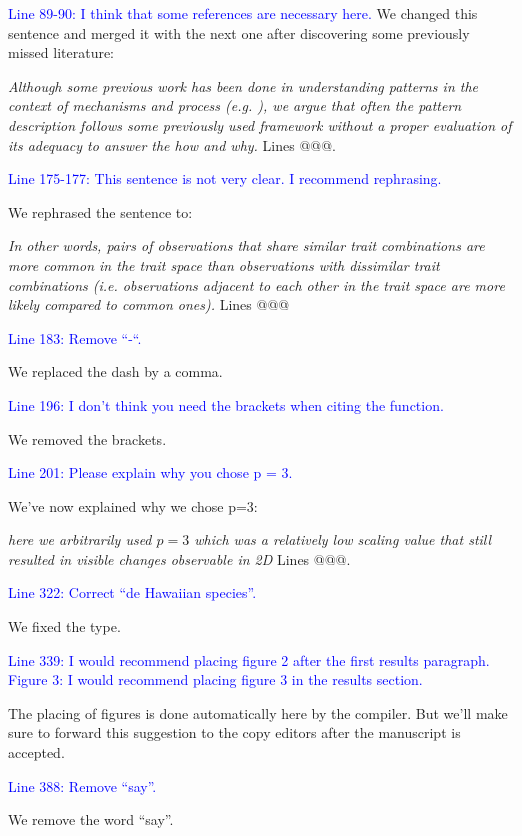 \documentclass[
]{article}
\begin{document}
\textcolor{blue}{Line 89-90: I think that some references are necessary here.}
We changed this sentence and merged it with the next one after discovering some previously missed literature:

\textit{Although some previous work has been done in understanding patterns in the context of mechanisms and process (e.g. \cite{novack2016general1,novack2016general2}), we argue that often the pattern description follows some previously used framework without a proper evaluation of its adequacy to answer the how and why.} Lines @@@.

\textcolor{blue}{Line 175-177: This sentence is not very clear. I recommend rephrasing.}

We rephrased the sentence to:

\textit{In other words, pairs of observations that share similar trait combinations are more common in the trait space than observations with dissimilar trait combinations (i.e. observations adjacent to each other in the trait space are more likely compared to common ones).} Lines @@@

\textcolor{blue}{Line 183: Remove “-“.}

We replaced the dash by a comma.

\textcolor{blue}{Line 196: I don’t think you need the brackets when citing the function. }

We removed the brackets.

\textcolor{blue}{Line 201: Please explain why you chose p = 3.}

We've now explained why we chose p=3:

\textit{here we arbitrarily used $p=3$ which was a relatively low scaling value that still resulted in visible changes observable in 2D} Lines @@@.

\textcolor{blue}{Line 322: Correct “de Hawaiian species”.}

We fixed the type.

\textcolor{blue}{Line 339: I would recommend placing figure 2 after the first results paragraph.}
\textcolor{blue}{Figure 3: I would recommend placing figure 3 in the results section. }

The placing of figures is done automatically here by the compiler.
But we'll make sure to forward this suggestion to the copy editors after the manuscript is accepted.

\textcolor{blue}{Line 388: Remove “say”.}

We remove the word ``say''.
\end{document}
